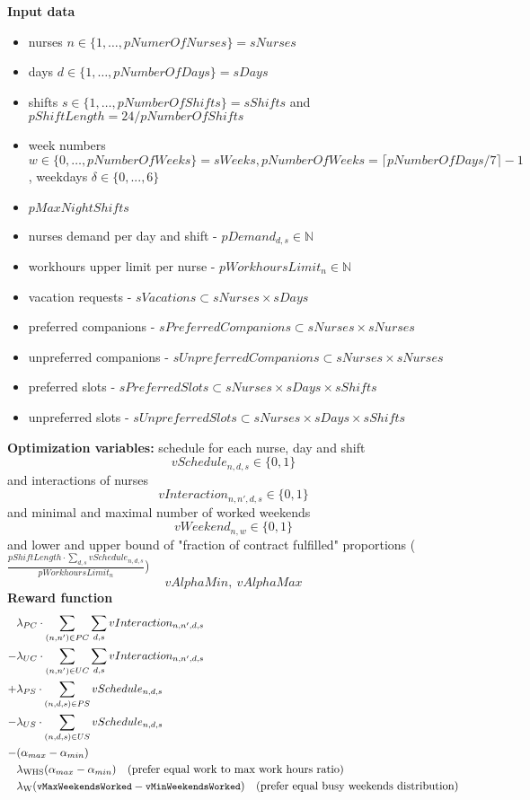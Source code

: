 \documentclass{article}
\newcommand{\N}{\mathbb{N}}
\newcommand{\varMinWeekendsWorked}{\texttt{\small vMinWeekendsWorked}}
\newcommand{\varMaxWeekendsWorked}{\texttt{\small vMaxWeekendsWorked}}
\begin{document}
\noindent \textbf{Input data}
\begin{itemize}
    \item nurses $n\in \{1, \dots, pNumerOfNurses\} = sNurses$
    \item days $d\in \{1, \dots, pNumberOfDays\} = sDays$
    \item shifts $s\in \{1, \dots, pNumberOfShifts\} = sShifts$ and $pShiftLength = 24/pNumberOfShifts$
    \item week numbers $w\in\{0, \dots, pNumberOfWeeks\} = sWeeks, pNumberOfWeeks=\lceil pNumberOfDays/7 \rceil - 1$, weekdays $\delta \in \{0, ..., 6\}$
    \item $pMaxNightShifts$
    \item nurses demand per day and shift - $pDemand_{d,s} \in \N$
    \item workhours upper limit per nurse - $pWorkhoursLimit_n \in \N$
    \item vacation requests - $sVacations \subset sNurses \times sDays$
    \item preferred companions - $sPreferredCompanions \subset sNurses \times sNurses$
    \item unpreferred companions - $sUnpreferredCompanions \subset sNurses \times sNurses$
    \item preferred slots - $sPreferredSlots \subset sNurses \times sDays \times sShifts$
    \item unpreferred slots - $sUnpreferredSlots \subset sNurses \times sDays \times sShifts$
\end{itemize}
\textbf{Optimization variables:} schedule for each nurse, day and shift 
$$vSchedule_{n,d,s} \in \{0,1\}$$
and interactions of nurses
$$vInteraction_{n,n',d,s} \in \{0,1\}$$
and minimal and maximal number of worked weekends
$$vWeekend_{n, w} \in \{0, 1\}$$
and lower and upper bound of "fraction of contract fulfilled" proportions ($\frac{pShiftLength\cdot\sum_{d,s}vSchedule_{n,d,s}}{pWorkhoursLimit_n}$)
$$vAlphaMin,\ vAlphaMax$$
\textbf{Reward function}
\begin{align*}
     &\lambda_{PC}\cdot\sum_{(n, n')\in PC}\sum_{d,s} vInteraction_{n,n',d,s} \\
    -&\lambda_{UC}\cdot\sum_{(n, n')\in UC}\sum_{d,s} vInteraction_{n,n',d,s} \\ 
    +&\lambda_{PS}\cdot\sum_{(n, d, s)\in PS} vSchedule_{n,d,s} \\ 
    -&\lambda_{US}\cdot\sum_{(n, d, s)\in US} vSchedule_{n,d,s} \\
    -&(\alpha_{max} - \alpha_{min})\\%
     &\lambda_\text{WHS} (\alpha_{max} - \alpha_{min})\quad \text{(prefer equal work to max work hours ratio)} \\
     &\lambda_\text{W} (\varMaxWeekendsWorked - \varMinWeekendsWorked)\quad \text{(prefer equal busy weekends distribution)}
\end{align*}
\end{document}
